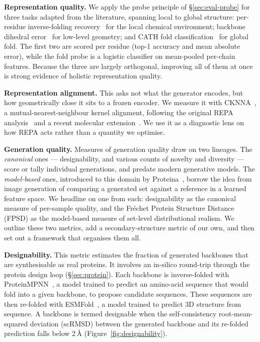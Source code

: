 \documentclass[12pt,a4paper,twoside]{report}
\begin{document}
\textbf{Representation quality.} We apply the probe principle of \S\ref{sec:eval-probe} for three tasks adapted from the literature, spanning local to global structure: per-residue inverse-folding recovery~\cite{Ingraham2019} for the local chemical environment; backbone dihedral error~\cite{ProteinWorkshop} for low-level geometry; and CATH fold classification~\cite{ProteinWorkshop} for global fold. The first two are scored per residue (top-1 accuracy and mean absolute error), while the fold probe is a logistic classifier on mean-pooled per-chain features. Because the three are largely orthogonal, improving all of them at once is strong evidence of holistic representation quality.

\textbf{Representation alignment.} This asks not what the generator encodes, but how geometrically close it sits to a frozen encoder. We measure it with CKNNA~\cite{PlatonicRep}, a mutual-nearest-neighbour kernel alignment, following the original REPA analysis~\cite{REPA} and a recent molecular extension~\cite{BoltzREPA}. We use it as a diagnostic lens on how REPA acts rather than a quantity we optimise.

\textbf{Generation quality.} Measures of generation quality draw on two lineages. The \emph{canonical} ones --- designability, and various counts of novelty and diversity --- score or tally individual generations, and predate modern generative models. The \emph{model-based} ones, introduced to this domain by Proteina~\cite{Proteina}, borrow the idea from image generation of comparing a generated set against a reference in a learned feature space. We headline on one from each: designability as the canonical measure of per-sample quality, and the Fr\'echet Protein Structure Distance (FPSD) as the model-based measure of set-level distributional realism. We outline these two metrics, add a secondary-structure metric of our own, and then set out a framework that organises them all.

\textbf{Designability.} This metric estimates the fraction of generated backbones that are synthesisable as real proteins. It involves an in-silico round-trip through the protein design loop (\S\ref{sec:protein}). Each backbone is inverse-folded with ProteinMPNN~\cite{ProteinMPNN}, a model trained to predict an amino-acid sequence that would fold into a given backbone, to propose candidate sequences. These sequences are then re-folded with ESMFold~\cite{ESM2}, a model trained to predict 3D structure from sequence. A backbone is termed designable when the self-consistency root-mean-squared deviation (scRMSD) between the generated backbone and its re-folded prediction falls below 2\,\AA{} (Figure~\ref{fig:designability}).
\end{document}
